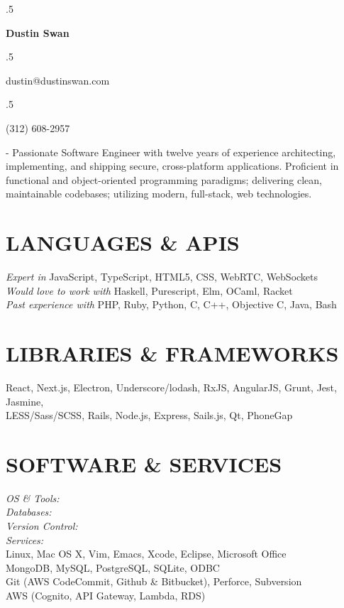 \documentclass[margin]{res}
\begin{document}
\begin{resume}

\moveleft.5\hoffset\centerline{\large\bf Dustin Swan}
\smallskip
\moveleft.5\hoffset\centerline{dustin@dustinswan.com}
\smallskip
\moveleft.5\hoffset\centerline{(312) 608-2957}

\newlength{\summarylength}
\setlength{\summarylength}{\textwidth+1.25in}

 -\sectionwidth \summarylength
Passionate Software Engineer with twelve years of experience architecting,
implementing, and shipping secure, cross-platform applications. Proficient in
functional and object-oriented programming paradigms; delivering clean,
maintainable codebases; utilizing modern, full-stack, web technologies.

\section{LANGUAGES \& APIS}
{\sl Expert in} JavaScript, TypeScript, HTML5, CSS, WebRTC, WebSockets \\
{\sl Would love to work with} Haskell, Purescript, Elm, OCaml, Racket \\
{\sl Past experience with} PHP, Ruby, Python, C, C++, Objective C, Java, Bash

\section{LIBRARIES \& FRAMEWORKS}
React, Next.js, Electron, Underscore/lodash, RxJS, AngularJS, Grunt, Jest, Jasmine, \\
LESS/Sass/SCSS, Rails, Node.js, Express, Sails.js, Qt, PhoneGap

\section{SOFTWARE \& SERVICES}
\begin{vwcol}[widths={0.2,0.8}, sep=.1cm, justify=flush,rule=0pt,indent=1em,lines=4] 
{\sl OS \& Tools:} \\
{\sl Databases:} \\
{\sl Version Control:} \\
{\sl Services:} \\
Linux, Mac OS X, Vim, Emacs, Xcode, Eclipse, Microsoft Office \\
MongoDB, MySQL, PostgreSQL, SQLite, ODBC \\
Git (AWS CodeCommit, Github & Bitbucket), Perforce, Subversion \\
AWS (Cognito, API Gateway, Lambda, RDS)
\end{vwcol}
 

\end{resume}
\end{document}

